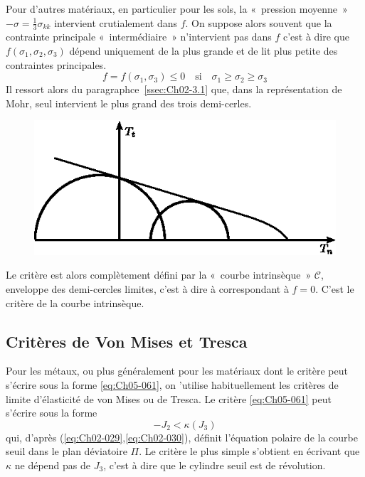 Pour d'autres matériaux, en particulier pour les sols, la «~pression moyenne~» $-\sigma = \frac{1}{3}\sigma_{kk}$ intervient crutialement dans $f$.
On suppose alors souvent que la contrainte principale «~intermédiaire~» n'intervient pas dans $f$ c'est à dire que $f\left( \sigma_1, \sigma_{2}, \sigma_3 \right)$ dépend uniquement de la plus grande et de lit plus petite des contraintes principales.
\begin{equation}
    f = f\left( \sigma_1, \sigma_3 \right) \leq 0 \quad \text{si} \quad \sigma_1 \geq \sigma_2 \geq \sigma_3
    \label{eq:Ch05-062}
\end{equation}
Il ressort alors du paragraphce~\ref{ssec:Ch02-3.1} que, dans la représentation de Mohr, seul intervient le plus grand des trois demi-cerles.
\begin{figure}
    \begin{center}
        \includegraphics{../images/T1_Ch05-03}
    \end{center}
\end{figure}
Le critère est alors complètement défini par la «~courbe intrinsèque~» $\mathcal{C}$, enveloppe des demi-cercles limites, c'est à dire à  correspondant à $f=0$. 
C'est le critère de la courbe intrinsèque.

\subsection{Critères de Von Mises et Tresca}
Pour les métaux, ou plus généralement pour les matériaux dont le critère peut s'écrire sous la forme \eqref{eq:Ch05-061}, on 'utilise habituellement les critères de limite d'élasticité de von Mises ou de Tresca.
Le critère \eqref{eq:Ch05-061} peut s'écrire sous la forme 
\begin{equation}
    -J_2 < \kappa\left( J_3 \right)
    \label{eq:Ch05-063}
\end{equation}
qui, d'après (\ref{eq:Ch02-029},\ref{eq:Ch02-030}), définit l'équation polaire de la courbe seuil dans le plan déviatoire  $\Pi$.
Le critère le plus simple s'obtient en écrivant que $\kappa$ ne dépend pas de $J_3$, c'est à dire que le cylindre seuil est de révolution.

